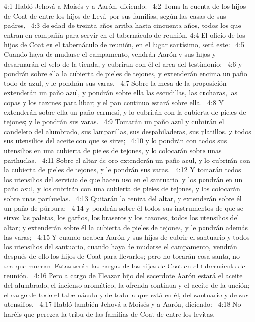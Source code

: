 4:1 Habló Jehová a Moisés y a Aarón, diciendo:  
4:2 Toma la cuenta de los hijos de Coat de entre los hijos de Leví, por sus familias, según las casas de sus padres,  
4:3 de edad de treinta años arriba hasta cincuenta años, todos los que entran en compañía para servir en el tabernáculo de reunión. 
4:4 El oficio de los hijos de Coat en el tabernáculo de reunión, en el lugar santísimo, será este:  
4:5 Cuando haya de mudarse el campamento, vendrán Aarón y sus hijos y desarmarán el velo de la tienda, y cubrirán con él el arca del testimonio;  
4:6 y pondrán sobre ella la cubierta de pieles de tejones, y extenderán encima un paño todo de azul, y le pondrán sus varas.  
4:7 Sobre la mesa de la proposición extenderán un paño azul, y pondrán sobre ella las escudillas, las cucharas, las copas y los tazones para libar; y el pan continuo estará sobre ella.  
4:8 Y extenderán sobre ella un paño carmesí, y lo cubrirán con la cubierta de pieles de tejones; y le pondrán sus varas.  
4:9 Tomarán un paño azul y cubrirán el candelero del alumbrado, sus lamparillas, sus despabiladeras, sus platillos, y todos sus utensilios del aceite con que se sirve;  
4:10 y lo pondrán con todos sus utensilios en una cubierta de pieles de tejones, y lo colocarán sobre unas parihuelas.  
4:11 Sobre el altar de oro extenderán un paño azul, y lo cubrirán con la cubierta de pieles de tejones, y le pondrán sus varas.  
4:12 Y tomarán todos los utensilios del servicio de que hacen uso en el santuario, y los pondrán en un paño azul, y los cubrirán con una cubierta de pieles de tejones, y los colocarán sobre unas parihuelas.  
4:13 Quitarán la ceniza del altar, y extenderán sobre él un paño de púrpura;  
4:14 y pondrán sobre él todos sus instrumentos de que se sirve: las paletas, los garfios, los braseros y los tazones, todos los utensilios del altar; y extenderán sobre él la cubierta de pieles de tejones, y le pondrán además las varas;  
4:15 Y cuando acaben Aarón y sus hijos de cubrir el santuario y todos los utensilios del santuario, cuando haya de mudarse el campamento, vendrán después de ello los hijos de Coat para llevarlos; pero no tocarán cosa santa, no sea que mueran. Estas serán las cargas de los hijos de Coat en el tabernáculo de reunión.  
4:16 Pero a cargo de Eleazar hijo del sacerdote Aarón estará el aceite del alumbrado, el incienso aromático, la ofrenda continua y el aceite de la unción; el cargo de todo el tabernáculo y de todo lo que está en él, del santuario y de sus utensilios.  
4:17 Habló también Jehová a Moisés y a Aarón, diciendo:  
4:18 No haréis que perezca la tribu de las familias de Coat de entre los levitas. 

